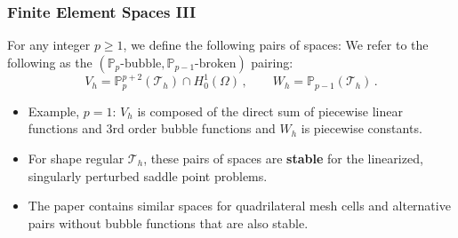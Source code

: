 \documentclass[aspectratio=169,xcolor=dvipsnames,11pt]{beamer}
\begin{document}
\begin{frame}\frametitle{Finite Element Spaces III}
For any integer $p \geq 1$, we define the following pairs of spaces:
\label{eq:SubspacePairs}
\smallskip
We refer to the following as the $(\mathbb{P}_p\text{-bubble},\mathbb{P}_{p-1}\text{-broken})$ pairing:
\begin{equation*}
\label{eq:SubspacePair1}
	V_h = \mathbb{P}_{p}^{p+2}(\mathcal{T}_h)\cap H^1_0(\Omega)
	\,,\qquad
	W_h = \mathbb{P}_{p-1}(\mathcal{T}_h)
	\,.
\end{equation*}
%
\vspace{-3ex}
\begin{itemize}
\item Example, $p = 1$: $V_h$ is composed of the direct sum of piecewise linear functions and 3rd order bubble functions and $W_h$ is piecewise constants. \pause
\item
For shape regular $\mathcal{T}_h$, these pairs of spaces are \textbf{stable} for the linearized, singularly perturbed saddle point problems.
\item 
The paper contains similar spaces for quadrilateral mesh cells and alternative pairs without bubble functions that are also stable.
\end{itemize}
\end{frame}
\end{document}
